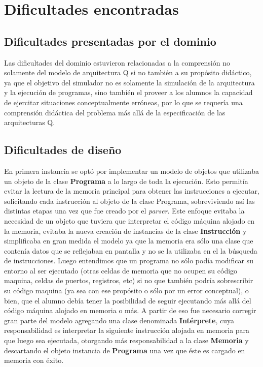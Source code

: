 
\section{Dificultades encontradas}

\subsection{Dificultades presentadas por el dominio}
Las dificultades del dominio estuvieron relacionadas a la comprensión no solamente del modelo de arquitectura Q si no también a su propósito didáctico, ya que el objetivo del simulador no es solamente la simulación de la arquitectura y la ejecución de programas, sino también el proveer a los alumnos la capacidad de ejercitar situaciones conceptualmente erróneas, por lo que se requería una comprensión didáctica del problema más allá de la especificación de las arquitecturas Q. 

\subsection{Dificultades de diseño}
En primera instancia se optó por implementar un modelo de objetos que utilizaba un objeto de la clase \textbf{Programa} a lo largo de toda la ejecución. Esto permitía evitar la lectura de la memoria principal para obtener las instrucciones a ejecutar, solicitando cada instrucción al objeto de la clase Programa, sobreviviendo así las distintas etapas una vez que fue creado por el \textit{parser}. Este enfoque evitaba la necesidad de un objeto que tuviera que interpretar el código máquina alojado en la memoria, evitaba la nueva creación de instancias de la clase \textbf{Instrucción} y simplificaba en gran medida el modelo ya que la memoria era sólo una clase que contenía datos que se reflejaban en pantalla y no se la utilizaba en el la búsqueda de instrucciones. Luego entendimos que un programa no sólo podía modificar su entorno al ser ejecutado (otras celdas de memoria que no ocupen su código maquina, celdas de puertos, registros, etc) si no que también podría sobrescribir su código maquina (ya sea con ese propósito o sólo por un error conceptual), o bien, que el alumno debía tener la posibilidad de seguir ejecutando más allá del código máquina alojado en memoria o más. A partir de eso fue necesario corregir gran parte del modelo agregando una clase denominada \textbf{Intérprete}, cuya responsabilidad es interpretar la siguiente instrucción alojada en memoria para que luego sea ejecutada, otorgando más responsabilidad a la clase \textbf{Memoria} y descartando el objeto instancia de \textbf{Programa} una vez que éste es cargado en memoria con éxito.\\

